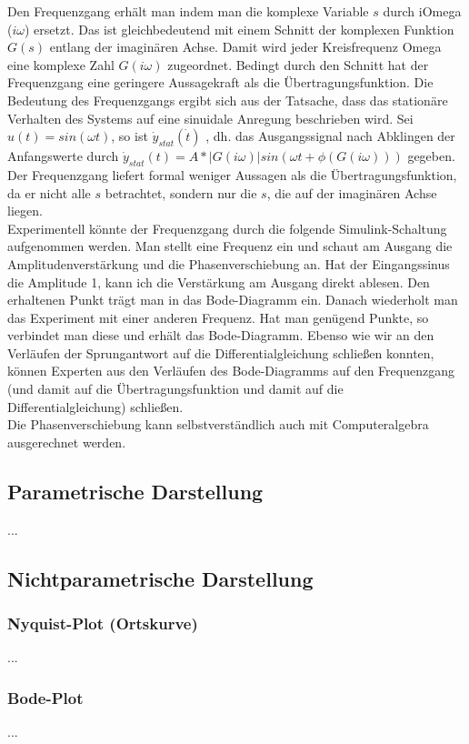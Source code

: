 Den Frequenzgang erhält man indem man die komplexe Variable $s$ durch iOmega ($i\omega$) ersetzt. Das ist gleichbedeutend mit einem Schnitt der komplexen Funktion $G(s)$ entlang der imaginären Achse. Damit wird jeder Kreisfrequenz Omega eine komplexe Zahl $G(i\omega)$ zugeordnet. Bedingt durch den Schnitt hat der Frequenzgang eine geringere Aussagekraft als die Übertragungsfunktion. Die Bedeutung des Frequenzgangs ergibt sich aus der Tatsache, dass das stationäre Verhalten des Systems auf eine sinuidale Anregung beschrieben wird.
Sei $u(t) = sin(\omega t)$, so ist $\dot{y}_{stat}(\dot{t})$ %
, dh. das Ausgangssignal nach Abklingen der Anfangswerte durch $\dot{y}_{stat}(t)=A*|G(i\omega )|sin(\omega t + \phi (G(i\omega )))$ gegeben. %
Der Frequenzgang liefert formal weniger Aussagen als die Übertragungsfunktion, da er nicht alle $s$ betrachtet, sondern nur die $s$, die auf der imaginären Achse liegen.\\
Experimentell könnte der Frequenzgang durch die folgende Simulink-Schaltung aufgenommen werden. 
Man stellt eine Frequenz ein und schaut am Ausgang die Amplitudenverstärkung und die Phasenverschiebung an. Hat der Eingangssinus die Amplitude 1, kann ich die Verstärkung am Ausgang direkt ablesen. Den erhaltenen Punkt trägt man in das Bode-Diagramm ein. Danach wiederholt man das Experiment mit einer anderen Frequenz. Hat man genügend Punkte, so verbindet man diese und erhält das Bode-Diagramm. Ebenso wie wir an den Verläufen der Sprungantwort auf die Differentialgleichung schließen konnten, können Experten aus den Verläufen des Bode-Diagramms auf den Frequenzgang (und damit auf die Übertragungsfunktion und damit auf die Differentialgleichung) schließen.\\
Die Phasenverschiebung kann selbstverständlich auch mit Computeralgebra ausgerechnet werden.
\subsection{Parametrische Darstellung}
...
\subsection{Nichtparametrische Darstellung}
\subsubsection{Nyquist-Plot (Ortskurve)}
...
\subsubsection{Bode-Plot}
...
